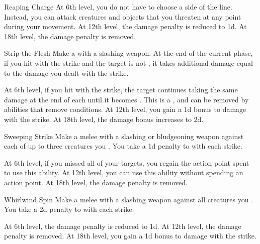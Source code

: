 {\begin{ability}{Reaping Charge}
                At 6th level, you do not have to choose a side of the line.
                Instead, you can attack creatures and objects that you threaten at any point during your movement.
                At 12th level, the damage penalty is reduced to \minus1d.
                At 18th level, the damage penalty is removed.
            \end{ability}

            \begin{ability}{Strip the Flesh}
                Make a  with a slashing weapon.
                At the end of the current phase, if you hit with the strike and the target is not , it takes additional damage equal to the damage you dealt with the strike.

                At 6th level, if you hit with the strike, the target continues taking the same damage at the end of each  until it becomes .
                This is a , and can be removed by abilities that remove conditions.
                At 12th level, you gain a \plus1d bonus to damage with the strike.
                At 18th level, the damage bonus increases to \plus2d.
            \end{ability}

            \begin{ability}{Sweeping Strike}
                Make a melee  with a slashing or bludgeoning weapon against each of up to three creatures you .
                You take a \minus1d penalty to  with each strike.

                At 6th level, if you missed all of your targets, you regain the action point spent to use this ability.
                At 12th level, you can use this ability without spending an action point.
                At 18th level, the damage penalty is removed.
            \end{ability}

            \begin{ability}{Whirlwind Spin}
                Make a melee  with a slashing weapon against all creatures you .
                You take a \minus2d penalty to  with each strike.

                At 6th level, the damage penalty is reduced to \minus1d.
                At 12th level, the damage penalty is removed.
                At 18th level, you gain a \plus1d bonus to damage with the strike.
            \end{ability}
        }

